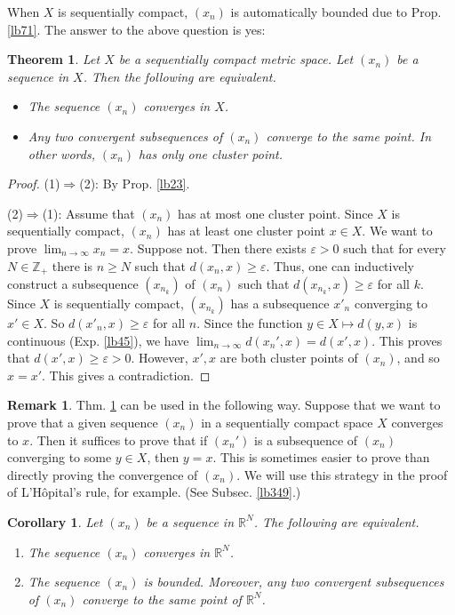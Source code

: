 \documentclass[12pt,b5paper,notitlepage]{article}
\theoremstyle{definition}
\newtheorem{rem}[df]{Remark}
\theoremstyle{plain}
\newtheorem{thm}[df]{Theorem}
\newtheorem{co}[df]{Corollary}
\newcommand{\Zbb}{\mathbb Z}
\newcommand{\Rbb}{\mathbb R}
\newcommand{\eps}{\varepsilon}
\numberwithin{equation}{section}
\begin{document}
When $X$ is sequentially compact, $(x_n)$ is automatically bounded due to Prop. \ref{lb71}. The answer to the above question is yes:

\begin{thm}\label{lb74}
Let $X$ be a sequentially compact metric space. Let $(x_n)$ be a sequence in $X$. Then the following are equivalent.
\begin{itemize}
\item[(1)] The sequence $(x_n)$ converges in $X$.
\item[(2)] Any two convergent subsequences of $(x_n)$ converge to the same point. In other words, $(x_n)$ has only one cluster point. 
\end{itemize}
\end{thm}


\begin{proof}
(1)$\Rightarrow$(2): By Prop. \ref{lb23}.

(2)$\Rightarrow$(1): Assume that $(x_n)$ has at most one cluster point. Since $X$ is sequentially compact, $(x_n)$ has at least one cluster point $x\in X$. We want to prove $\lim_{n\rightarrow\infty} x_n=x$. Suppose not. Then there exists $\eps>0$ such that for every $N\in\Zbb_+$ there is $n\geq N$ such that $d(x_n,x)\geq \eps$. Thus, one can inductively construct a subsequence $(x_{n_k})$ of $(x_n)$ such that $d(x_{n_k},x)\geq\eps$ for all $k$. Since $X$ is sequentially compact, $(x_{n_k})$ has a subsequence $x'_n$ converging to $x'\in X$. So $d(x'_n,x)\geq\eps$ for all $n$. Since the function $y\in X\mapsto d(y,x)$ is continuous (Exp. \ref{lb45}), we have $\lim_{n\rightarrow\infty}d(x_n',x)=d(x',x)$. This proves that $d(x',x)\geq\eps>0$. However, $x',x$ are both cluster points of $(x_n)$, and so $x=x'$. This gives a contradiction. 
\end{proof}

\begin{rem}
Thm. \ref{lb74} can be used in the following way. Suppose that we want to prove that a given sequence $(x_n)$ in a sequentially compact space $X$ converges to $x$. Then it suffices to prove that if $(x_n')$ is a subsequence of $(x_n)$ converging to some $y\in X$, then $y=x$. This is sometimes easier to prove than directly proving the convergence of $(x_n)$. We will use this strategy in the proof of L'H\^opital's rule, for example. (See Subsec. \ref{lb349}.)
\end{rem}





\begin{co}\label{lb75}
Let $(x_n)$ be a sequence in $\Rbb^N$. The following are equivalent.
\begin{enumerate}[label=(\arabic*)]
\item The sequence $(x_n)$ converges in $\Rbb^N$.
\item The sequence $(x_n)$ is bounded. Moreover, any two convergent subsequences of $(x_n)$ converge to the same point of $\Rbb^N$.
\end{enumerate}
\end{co}
\end{document}

